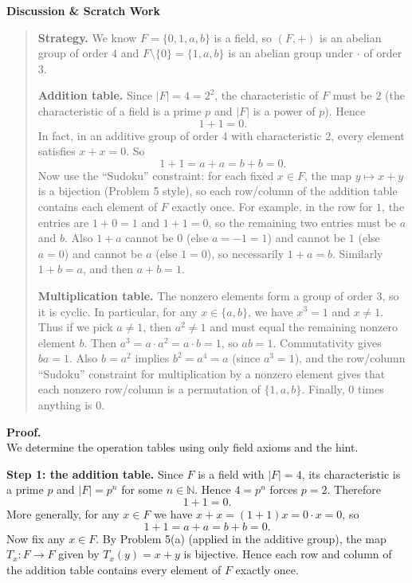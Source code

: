 \documentclass[12pt]{article}
\newenvironment{scratch}{%
  \par\smallskip
  \noindent\textbf{Discussion \& Scratch Work}\begin{quote}\small
}{%
  \end{quote}\smallskip
}
\begin{document}
\begin{scratch}
\textbf{Strategy.} We know $F=\{0,1,a,b\}$ is a field, so $(F,+)$ is an abelian group of order $4$ and
$F\setminus\{0\}=\{1,a,b\}$ is an abelian group under $\cdot$ of order $3$.

\medskip
\textbf{Addition table.} Since $|F|=4=2^2$, the characteristic of $F$ must be $2$ (the characteristic of a field is a prime $p$ and $|F|$ is a power of $p$). Hence
\[
1+1=0.
\]
In fact, in an additive group of order $4$ with characteristic $2$, every element satisfies $x+x=0$.
So
\[
1+1=a+a=b+b=0.
\]
Now use the “Sudoku” constraint: for each fixed $x\in F$, the map $y\mapsto x+y$ is a bijection (Problem 5 style), so each row/column of the addition table contains each element of $F$ exactly once.
For example, in the row for $1$, the entries are $1+0=1$ and $1+1=0$, so the remaining two entries must be $a$ and $b$.
Also $1+a$ cannot be $0$ (else $a=-1=1$) and cannot be $1$ (else $a=0$) and cannot be $a$ (else $1=0$), so necessarily $1+a=b$. Similarly $1+b=a$, and then $a+b=1$.

\medskip
\textbf{Multiplication table.} The nonzero elements form a group of order $3$, so it is cyclic. In particular, for any $x\in\{a,b\}$, we have $x^3=1$ and $x\neq 1$.
Thus if we pick $a\neq 1$, then $a^2\neq 1$ and must equal the remaining nonzero element $b$.
Then $a^3=a\cdot a^2=a\cdot b=1$, so $ab=1$. Commutativity gives $ba=1$.
Also $b=a^2$ implies $b^2=a^4=a$ (since $a^3=1$), and the row/column “Sudoku” constraint for multiplication by a nonzero element gives that each nonzero row/column is a permutation of $\{1,a,b\}$.
Finally, $0$ times anything is $0$.
\end{scratch}

\textbf{Proof.}\\
We determine the operation tables using only field axioms and the hint.

\medskip
\textbf{Step 1: the addition table.}
Since $F$ is a field with $|F|=4$, its characteristic is a prime $p$ and $|F|=p^n$ for some $n\in\mathbb{N}$. Hence $4=p^n$ forces $p=2$. Therefore
\[
1+1=0.
\]
More generally, for any $x\in F$ we have $x+x=(1+1)x=0\cdot x=0$, so
\[
1+1=a+a=b+b=0.
\]
Now fix any $x\in F$. By Problem 5(a) (applied in the additive group), the map $T_x:F\to F$ given by $T_x(y)=x+y$ is bijective. Hence each row and column of the addition table contains every element of $F$ exactly once.
\end{document}
